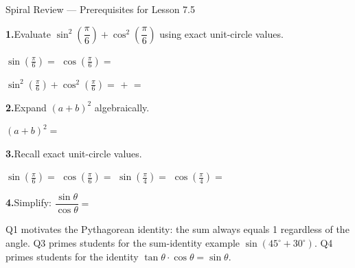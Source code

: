 \documentclass[10pt]{article}
\begin{document}
\namedateperiod

\vspace{0.10in}

\begin{notesbox}{Spiral Review --- Prerequisites for Lesson 7.5}

\textbf{1.}\quad Evaluate $\sin^2\!\left(\dfrac{\pi}{6}\right) + \cos^2\!\left(\dfrac{\pi}{6}\right)$
using exact unit-circle values.

\vspace{4pt}
$\sin\!\left(\tfrac{\pi}{6}\right) = $ \quad
$\cos\!\left(\tfrac{\pi}{6}\right) = $ 

\vspace{6pt}
$\sin^2\!\left(\tfrac{\pi}{6}\right) + \cos^2\!\left(\tfrac{\pi}{6}\right)
= $  $+$  $=$ 

\vspace{0.14in}
\textbf{2.}\quad Expand $(a + b)^2$ algebraically.

\vspace{4pt}
$(a + b)^2 = $ 

\vspace{0.14in}
\textbf{3.}\quad Recall exact unit-circle values.

\vspace{4pt}
$\sin\!\left(\tfrac{\pi}{6}\right) = $ \hspace{0.6cm}
$\cos\!\left(\tfrac{\pi}{6}\right) = $ \hspace{0.6cm}
$\sin\!\left(\tfrac{\pi}{4}\right) = $ \hspace{0.6cm}
$\cos\!\left(\tfrac{\pi}{4}\right) = $ 

\vspace{0.14in}
\textbf{4.}\quad Simplify: $\dfrac{\sin\theta}{\cos\theta} = $ \ans{$\tan\theta$}

\begin{teachernote}
Q1 motivates the Pythagorean identity: the sum always equals 1 regardless of the angle.
Q3 primes students for the sum-identity example $\sin(45^\circ + 30^\circ)$.
Q4 primes students for the identity $\tan\theta \cdot \cos\theta = \sin\theta$.
\end{teachernote}

\end{notesbox}
\end{document}
